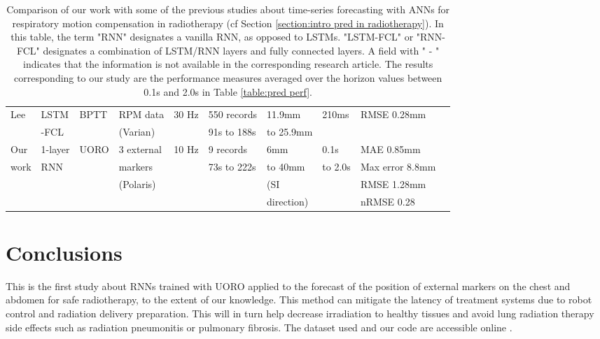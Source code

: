 \documentclass[twocolumn,a4paper]{svjour3} \sloppy          \smartqed
\begin{document}
\begin{table*}[htb]
\begin{center}
\begin{tabular}{llllllllll}
Lee \cite{lee2021geometric}    & LSTM    & BPTT              & RPM data       & 30 Hz    & 550 records     & 11.9mm      & 210ms    & RMSE 0.28mm      \\
                               & -FCL    &                   & (Varian)       &          & 91s to 188s     & to 25.9mm   &          &                  \\                               
\hline
Our                            & 1-layer & UORO              & 3 external     & 10 Hz    & 9 records       & 6mm         & 0.1s     & MAE 0.85mm       \\
work                           & RNN     &                   & markers        &          & 73s to 222s     & to 40mm     & to 2.0s  & Max error 8.8mm  \\
                               &         &                   & (Polaris)      &          &                 & (SI         &          & RMSE 1.28mm      \\
                               &         &                   &                &          &                 & direction)  &          & nRMSE 0.28       \\                               
\hline 
\end{tabular}
\end{center}
\caption{Comparison of our work with some of the previous studies about time-series forecasting with ANNs for respiratory motion compensation in radiotherapy (cf Section \ref{section:intro pred in radiotherapy}). In this table, the term "RNN" designates a vanilla RNN, as opposed to LSTMs. "LSTM-FCL" or "RNN-FCL" designates a combination of LSTM/RNN layers and fully connected layers. A field with " - " indicates that the information is not available in the corresponding research article. The results corresponding to our study are the performance measures averaged over the horizon values between 0.1s and 2.0s in Table \ref{table:pred perf}. \protect\footnotemark}
\label{table:comparison_with litterature}
\end{table*}


\section{Conclusions}

This is the first study about RNNs trained with UORO applied to the forecast of the position of external markers on the chest and abdomen for safe radiotherapy, to the extent of our knowledge. This method can mitigate the latency of treatment systems due to robot control and radiation delivery preparation. This will in turn help decrease irradiation to healthy tissues and avoid lung radiation therapy side effects such as radiation pneumonitis or pulmonary fibrosis. The dataset used and our code are accessible online \cite{krilavicius2015predicting, pohl_michel_2021_5506965}. 
\end{document}
